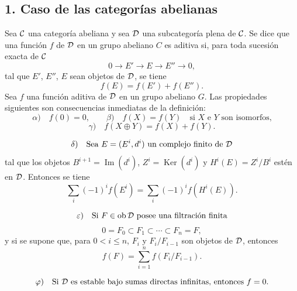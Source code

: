\subsection*{1. Caso de las categorías abelianas}

Sea $\mathcal C$ una categoría abeliana y sea $\mathcal D$ una subcategoría plena de $\mathcal C$. Se dice que una función $f$ de $\mathcal D$ en un grupo abeliano $C$ es aditiva si, para toda sucesión exacta de $\mathcal C$
\[
0\longrightarrow E'\longrightarrow E\longrightarrow E''\longrightarrow 0,
\]
tal que $E'$, $E''$, $E$ sean objetos de $\mathcal D$, se tiene
\[
f(E)=f(E')+f(E'').
\]
Sea $f$ una función aditiva de $\mathcal D$ en un grupo abeliano $G$. Las propiedades siguientes son consecuencias inmediatas de la definición:
\[
\alpha)\quad f(0)=0,\qquad
\beta)\quad f(X)=f(Y)\quad\text{si }X\text{ e }Y\text{ son isomorfos,}
\]
\[
\gamma)\quad f(X\oplus Y)=f(X)+f(Y).
\]

\[
\delta)\quad
\text{Sea }E=(E^i,d^i)\text{ un complejo finito de }\mathcal D
\]
tal que los objetos $B^{i+1}=\operatorname{Im}(d^i)$, $Z^i=\operatorname{Ker}(d^i)$ y $H^i(E)=Z^i/B^i$ estén en $\mathcal D$. Entonces se tiene
\[
\sum_i (-1)^i f(E^i)=\sum_i (-1)^i f(H^i(E)).
\]

\[
\varepsilon)\quad
\text{Si }F\in\operatorname{ob} \mathcal D\text{ posee una filtración finita}
\]
\[
0=F_0\subset F_1\subset\cdots\subset F_n=F,
\]
y si se supone que, para $0<i\le n$, $F_i$ y $F_i/F_{i-1}$ son objetos de $\mathcal D$, entonces
\[
f(F)=\sum_{i=1}^n f(F_i/F_{i-1}).
\]

\[
\varphi)\quad
\text{Si }\mathcal D\text{ es estable bajo sumas directas infinitas, entonces }f=0.
\]
